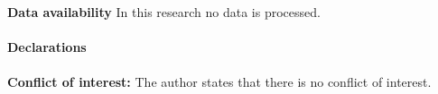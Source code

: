 \documentclass[12pt]{amsart}
\numberwithin{figure}{section}
\numberwithin{table}{section}
\numberwithin{equation}{section}
\begin{document}
\noindent\textbf{Data availability} In this research no data is processed.\\
\noindent\\ 
\textbf{Declarations}\\\\
\textbf{Conflict of interest:} The author states that there is no conflict of interest.




	
\end{document}
